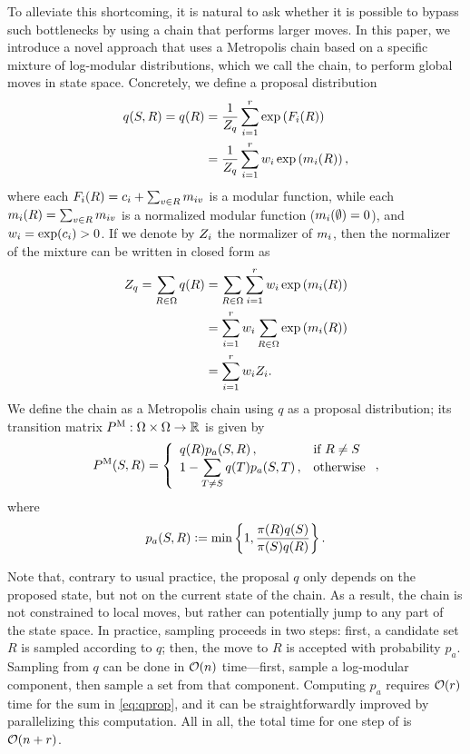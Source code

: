 To alleviate this shortcoming, it is natural to ask whether it is possible to bypass such bottlenecks by using a chain that performs larger moves.
In this paper, we introduce a novel approach that uses a Metropolis chain based on a specific mixture of log-modular distributions, which we call the \Ms{} chain, to perform global moves in state space.
Concretely, we define a proposal distribution
\begin{align} \label{eq:qprop}
  q(S, R) = q(R) &= \frac{1}{Z_q} \sum_{i = 1}^{r} \exp\left( F_i(R) \right) \nonumber\\
                 &= \frac{1}{Z_q} \sum_{i = 1}^{r} w_i \exp\left(m_i(R) \right),
\end{align}
where each $F_i(R) = c_i + \sum_{v \in R}m_{iv}$ is a modular function, while each $m_i(R) = \sum_{v \in R}m_{iv}$ is a normalized modular function ($m_i(\emptyset) = 0$), and $w_i = \exp(c_i) > 0$.
If we denote by $Z_i$ the normalizer of $m_i$, then the normalizer of the mixture can be written in closed form as
\begin{align*}
  Z_q = \sum_{R \in \Omega}q(R) &= \sum_{R \in \Omega}\sum_{i = 1}^{r} w_i \exp\left(m_i(R) \right)\\
                                &= \sum_{i = 1}^{r} w_i \sum_{R \in \Omega} \exp\left(m_i(R) \right)\\
                                &= \sum_{i = 1}^r w_i Z_i.
\end{align*}
We define the \Ms{} chain as a Metropolis chain \citep{levin08book} using $q$ as a proposal distribution; its transition matrix $P^{\mathrm{M}} : \Omega \times \Omega \to \mathbb{R}$ is given by
\begin{align*}
  P^{\mathrm{M}}(S, R) = \left\{ \begin{array}{ll} q(R) p_a(S, R)\,,& \mbox{if } R \neq S \\ 1 - \displaystyle\sum_{T \neq S} q(T) p_a(S, T)\,,& \mbox{otherwise} \end{array} \right.,
\end{align*}
where
\begin{align*}
  p_{a}(S, R) \vcentcolon= \min\left\{1, \displaystyle\frac{\pi(R)q(S)}{\pi(S)q(R)}\right\}.
\end{align*}

Note that, contrary to usual practice, the proposal $q$ only depends on the proposed state, but not on the current state of the chain.
As a result, the chain is not constrained to local moves, but rather can potentially jump to any part of the state space.
In practice, \Ms{} sampling proceeds in two steps: first, a candidate set $R$ is sampled according to $q$; then, the move to $R$ is accepted with probability $p_a$.
Sampling from $q$ can be done in $\mathcal{O}(n)$ time---first, sample a log-modular component, then sample a set from that component.
Computing $p_a$ requires $\mathcal{O}(r)$ time for the sum in \eqref{eq:qprop}, and it can be straightforwardly improved by parallelizing this computation.
All in all, the total time for one step of \Ms{} is $\mathcal{O}(n + r)$.


